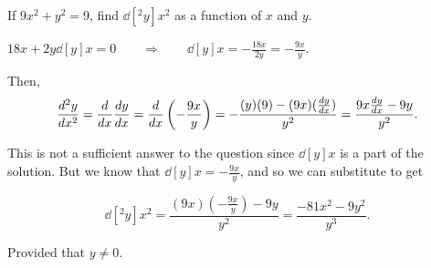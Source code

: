 \documentclass[handout,nooutcomes]{ximera}
\begin{document}
	
	
	
	
	
	
	
			
			

\begin{problem}
If $9x^2 + y^2 = 9$, find $\dd[^2 y]{x^2}$ as a function of $x$ and $y$.
		\begin{freeResponse}
		$18x + 2y \dd[y]{x} = 0 \qquad \Longrightarrow \qquad \dd[y]{x} = - \frac{18x}{2y} = - \frac{9x}{y}$.
		
		Then,
		$$ \dd[^2y]{x^2} = \ddx \dd[y]{x} = \ddx \left( - \frac{9x}{y} \right) = - \frac{(y)(9) - (9x)(\dd[y]{x} )}{y^2} = \frac{9x\dd[y]{x} - 9y}{y^2}. $$
		
		This is not a sufficient answer to the question since $\dd[y]{x}$ is a part of the solution.  But we know that $\dd[y]{x} = -\frac{9x}{y}$, and so we can substitute to get
		
		$$ \dd[^2y]{x^2} = \frac{(9x) \left(- \frac{9x}{y} \right) - 9y}{y^2} = \frac{-81x^2 - 9y^2}{y^3}. $$
		
		Provided that $y \neq 0$.  
		\end{freeResponse}
		
		
		
	
		
\end{problem}
















	
	
	
	
	
	
	
	
	

	










								
				
				
	
\end{document}
